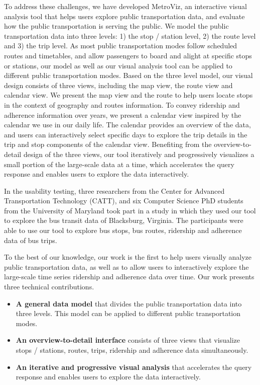 \documentclass[journal]{vgtc}                %
\begin{document}
To address these challenges, we have developed MetroViz, an interactive visual analysis tool that helps users explore public transportation data, and evaluate how the public transportation is serving the public. 
We model the public transportation data into three levels: 1) the stop / station level, 2) the route level and 3) the trip level. As most public transportation modes follow scheduled routes and timetables, and allow passengers to board and alight at specific stops or stations, our model as well as our visual analysis tool can be applied to different public transportation modes. 
Based on the three level model, our visual design consists of three views, including the map view, the route view and calendar view. 
We present the map view and the route to help users locate stops in the context of geography and routes information. To convey ridership and adherence information over years, we present a calendar view inspired by the calendar we use in our daily life. The calendar provides an overview of the data, and users can interactively select specific days to explore the trip details in the trip and stop components of the calendar view. 
Benefiting from the overview-to-detail design of the three views, our tool iteratively and progressively visualizes a small portion of the large-scale data at a time, which accelerates the query response and enables users to explore the data interactively.

In the usability testing, three researchers from the Center for Advanced Transportation Technology (CATT), and six Computer Science PhD students from the University of Maryland took part in a study in which they used our tool to explore the bus transit data of Blacksburg, Virginia. The participants were able to use our tool to explore bus stops, bus routes, ridership and adherence data of bus trips.

To the best of our knowledge, our work is the first to help users visually analyze public transportation data, as well as to allow users to interactively explore the large-scale time series ridership and adherence data over time. Our work presents three technical contributions.

\begin{itemize}
  \item \textbf{A general data model} that divides the public transportation data into three levels. This model can be applied to different public transportation modes.
  \item \textbf{An overview-to-detail interface} consists of three views that visualize stops / stations, routes, trips, ridership and adherence data simultaneously.
  \item \textbf{An iterative and progressive visual analysis} that accelerates the query response and enables users to explore the data interactively.
\end{itemize}
\end{document}
